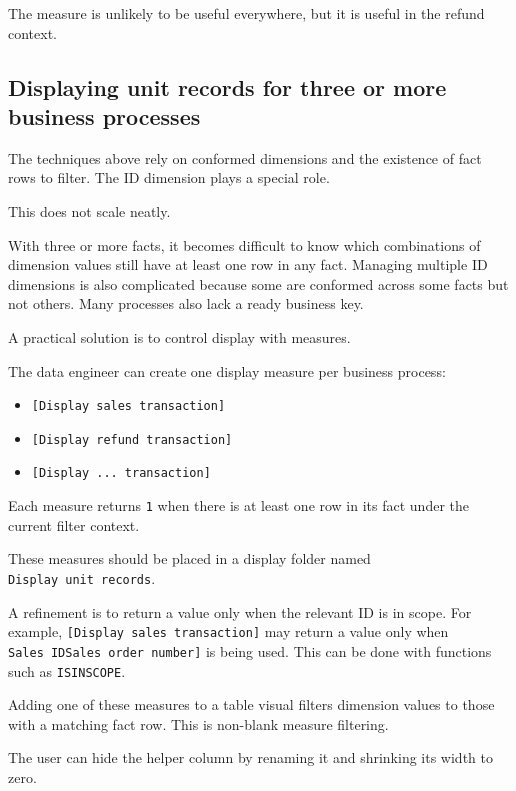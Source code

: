 \documentclass[10pt,openany,10pt]{book}
\providecommand{\tightlist}{%
  \setlength{\itemsep}{0pt}\setlength{\parskip}{0pt}}
\begin{document}
The measure is unlikely to be useful everywhere, but it is useful in the
refund context.

\subsection{Displaying unit records for three or more business
processes}\label{displaying-unit-records-for-three-or-more-business-processes}

The techniques above rely on conformed dimensions and the existence of
fact rows to filter. The ID dimension plays a special role.

This does not scale neatly.

With three or more facts, it becomes difficult to know which
combinations of dimension values still have at least one row in any
fact. Managing multiple ID dimensions is also complicated because some
are conformed across some facts but not others. Many processes also lack
a ready business key.

A practical solution is to control display with measures.

The data engineer can create one display measure per business process:

\begin{itemize}
\tightlist
\item
  \texttt{{[}Display\ sales\ transaction{]}}
\item
  \texttt{{[}Display\ refund\ transaction{]}}
\item
  \texttt{{[}Display\ ...\ transaction{]}}
\end{itemize}

Each measure returns \texttt{1} when there is at least one row in its
fact under the current filter context.

These measures should be placed in a display folder named
\texttt{Display\ unit\ records}.

A refinement is to return a value only when the relevant ID is in scope.
For example, \texttt{{[}Display\ sales\ transaction{]}} may return a
value only when
\texttt{\textquotesingle{}Sales\ ID\textquotesingle{}{[}Sales\ order\ number{]}}
is being used. This can be done with functions such as
\texttt{ISINSCOPE}.

Adding one of these measures to a table visual filters dimension values
to those with a matching fact row. This is non-blank measure filtering.

The user can hide the helper column by renaming it and shrinking its
width to zero.
\end{document}
